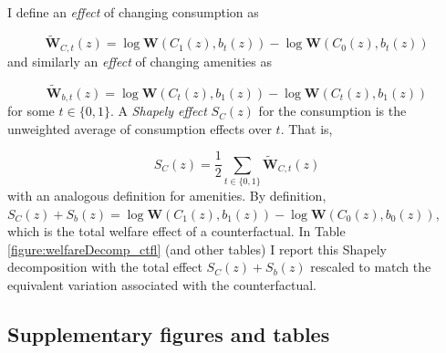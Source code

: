 \documentclass[12pt]{article}
\begin{document}
		\paragraph*{}
		I define an \textit{effect} of changing consumption as
		
		\begin{equation}
			\tilde{\boldsymbol{W}}_{C, t}(z) = \log \boldsymbol{W}(C_{1}(z), b_{t}(z)) - \log \boldsymbol{W}(C_{0}(z), b_{t}(z))
		\end{equation}
		and similarly an \textit{effect} of changing amenities as 
		
		\begin{equation*}
			\tilde{\boldsymbol{W}}_{b, t}(z) = \log \boldsymbol{W}(C_{t}(z), b_{1}(z)) - \log \boldsymbol{W}(C_{t}(z), b_{1}(z))
		\end{equation*}
		for some $t \in \{0, 1\}$. A \textit{Shapely effect} $S_{C}(z)$ for the consumption is the unweighted average of consumption effects over $t$. That is, 
		
		\begin{equation}
			S_{C}(z) = \frac{1}{2}\sum_{t \in \{0, 1\}}	\tilde{\boldsymbol{W}}_{C, t}(z)
		\end{equation}
		with an analogous definition for amenities. By definition, 	$S_{C}(z) + S_{b}(z) = \log \boldsymbol{W}(C_{1}(z), b_{1}(z)) - \log \boldsymbol{W}(C_{0}(z), b_{0}(z))$, which is the total welfare effect of a counterfactual. In Table \ref{figure:welfareDecomp_ctfl} (and other tables) I report this Shapely decomposition with the total effect $S_{C}(z) + S_{b}(z)$ rescaled to match the equivalent variation associated with the counterfactual. 
		
	\clearpage
	
	\subsection{Supplementary figures and tables}\label{Appendix:CounterfactualSupplmentaryFigures}
	
\end{document}
